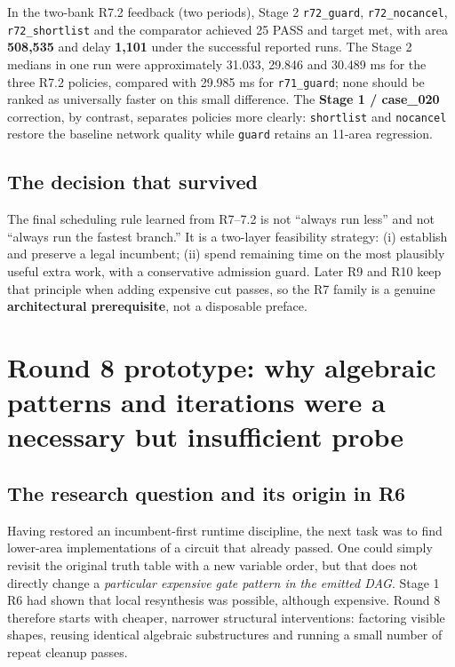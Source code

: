 In the two-bank R7.2 feedback (two periods), Stage 2 \texttt{r72\_guard}, \texttt{r72\_nocancel}, \texttt{r72\_shortlist} and the comparator achieved 25 PASS and target met, with area \textbf{508,535} and delay \textbf{1,101} under the successful reported runs. The Stage 2 medians in one run were approximately 31.033, 29.846 and 30.489 ms for the three R7.2 policies, compared with 29.985 ms for \texttt{r71\_guard}; none should be ranked as universally faster on this small difference. The \textbf{Stage 1 / case\_020} correction, by contrast, separates policies more clearly: \texttt{shortlist} and \texttt{nocancel} restore the baseline network quality while \texttt{guard} retains an 11-area regression.

\subsection{The decision that survived}\label{the-decision-that-survived}

The final scheduling rule learned from R7--7.2 is not ``always run less'' and not ``always run the fastest branch.'' It is a two-layer feasibility strategy: (i) establish and preserve a legal incumbent; (ii) spend remaining time on the most plausibly useful extra work, with a conservative admission guard. Later R9 and R10 keep that principle when adding expensive cut passes, so the R7 family is a genuine \textbf{architectural prerequisite}, not a disposable preface.

\section{Round 8 prototype: why algebraic patterns and iterations were a necessary but insufficient probe}\label{round-8-prototype-why-algebraic-patterns-and-iterations-were-a-necessary-but-insufficient-probe}

\subsection{The research question and its origin in R6}\label{the-research-question-and-its-origin-in-r6}

Having restored an incumbent-first runtime discipline, the next task was to find lower-area implementations of a circuit that already passed. One could simply revisit the original truth table with a new variable order, but that does not directly change a \emph{particular expensive gate pattern in the emitted DAG}. Stage 1 R6 had shown that local resynthesis was possible, although expensive. Round 8 therefore starts with cheaper, narrower structural interventions: factoring visible shapes, reusing identical algebraic substructures and running a small number of repeat cleanup passes.

